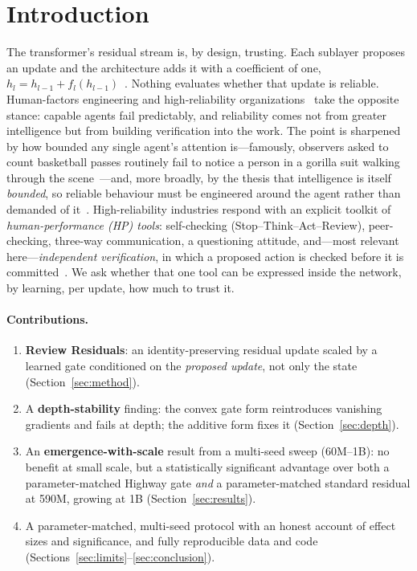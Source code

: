\documentclass[11pt]{article}
\begin{document}
\section{Introduction}
The transformer's residual stream is, by design, trusting. Each sublayer proposes an update and the
architecture adds it with a coefficient of one, $h_l = h_{l-1} + f_l(h_{l-1})$~\cite{he2016,vaswani2017}.
Nothing evaluates whether that update is reliable. Human-factors engineering and high-reliability
organizations~\cite{reason1990,weick2007} take the opposite stance: capable agents fail predictably, and
reliability comes not from greater intelligence but from building verification into the work. The point is
sharpened by how bounded any single agent's attention is---famously, observers asked to count basketball
passes routinely fail to notice a person in a gorilla suit walking through the scene~\cite{simons1999}---and,
more broadly, by the thesis that intelligence is itself \emph{bounded}, so reliable behaviour must be
engineered around the agent rather than demanded of it~\cite{kramer2026}. High-reliability industries respond
with an explicit toolkit of \emph{human-performance (HP) tools}: self-checking (Stop--Think--Act--Review),
peer-checking, three-way communication, a questioning attitude, and---most relevant here---\emph{independent
verification}, in which a proposed action is checked before it is committed~\cite{doe2009}. We ask whether that
one tool can be expressed inside the network, by learning, per update, how much to trust it.

\paragraph{Contributions.}
\begin{enumerate}[leftmargin=1.4em,itemsep=2pt]
\item \textbf{Review Residuals}: an identity-preserving residual update scaled by a learned gate conditioned on
the \emph{proposed update}, not only the state (Section~\ref{sec:method}).
\item A \textbf{depth-stability} finding: the convex gate form reintroduces vanishing gradients and fails at
depth; the additive form fixes it (Section~\ref{sec:depth}).
\item An \textbf{emergence-with-scale} result from a multi-seed sweep (60M--1B): no benefit at small scale, but
a statistically significant advantage over both a parameter-matched Highway gate \emph{and} a parameter-matched
standard residual at 590M, growing at 1B (Section~\ref{sec:results}).
\item A parameter-matched, multi-seed protocol with an honest account of effect sizes and significance, and
fully reproducible data and code (Sections~\ref{sec:limits}--\ref{sec:conclusion}).
\end{enumerate}
\end{document}
